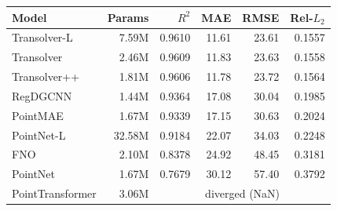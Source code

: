 \begin{tabular}{lrrrrr}
\toprule
Model & Params & $R^2$ & MAE & RMSE & Rel-$L_2$ \\
\midrule
Transolver-L & 7.59M & 0.9610 & 11.61 & 23.61 & 0.1557 \\
Transolver & 2.46M & 0.9609 & 11.83 & 23.63 & 0.1558 \\
Transolver++ & 1.81M & 0.9606 & 11.78 & 23.72 & 0.1564 \\
RegDGCNN & 1.44M & 0.9364 & 17.08 & 30.04 & 0.1985 \\
PointMAE & 1.67M & 0.9339 & 17.15 & 30.63 & 0.2024 \\
PointNet-L & 32.58M & 0.9184 & 22.07 & 34.03 & 0.2248 \\
FNO & 2.10M & 0.8378 & 24.92 & 48.45 & 0.3181 \\
PointNet & 1.67M & 0.7679 & 30.12 & 57.40 & 0.3792 \\
PointTransformer & 3.06M & \multicolumn{4}{c}{diverged (NaN)} \\
\bottomrule
\end{tabular}
